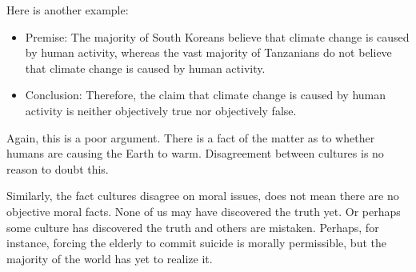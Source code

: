 \documentclass[9pt]{article}
\providecommand{\tightlist}{%
  \setlength{\itemsep}{0pt}\setlength{\parskip}{0pt}}
\begin{document}
Here is another example:

\begin{itemize}
\tightlist
\item
  Premise: The majority of South Koreans believe that climate change is
  caused by human activity, whereas the vast majority of Tanzanians do
  not believe that climate change is caused by human activity.
\item
  Conclusion: Therefore, the claim that climate change is caused by
  human activity is neither objectively true nor objectively false.
\end{itemize}

Again, this is a poor argument. There is a fact of the matter as to
whether humans are causing the Earth to warm. Disagreement between
cultures is no reason to doubt this.

Similarly, the fact cultures disagree on moral issues, does not mean
there are no objective moral facts. None of us may have discovered the
truth yet. Or perhaps some culture has discovered the truth and others
are mistaken. Perhaps, for instance, forcing the elderly to commit
suicide is morally permissible, but the majority of the world has yet to
realize it.
\end{document}
